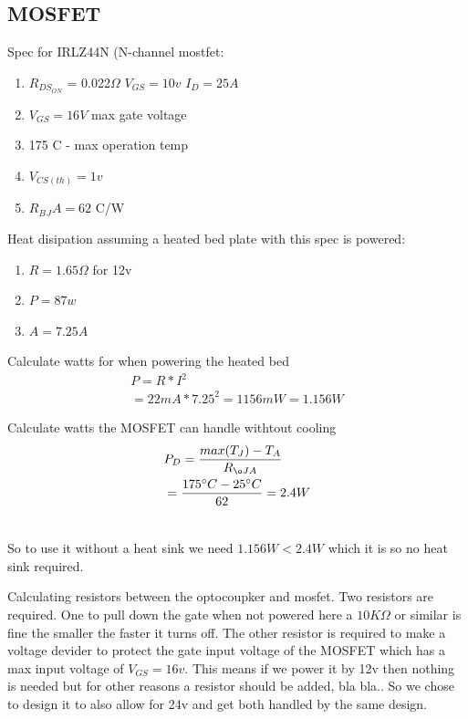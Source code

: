 \documentclass{article}
\begin{document}
\subsection{MOSFET}

Spec for IRLZ44N (N-channel mostfet:

\begin{enumerate}
	\item $R_{DS_{ON}}$ = 0.022$\Omega$ $V_{GS}=10v$ $I_D = 25A$
	\item $V_{GS}=16V$ max gate voltage
	\item 175 \degree{}C - max operation temp
	\item $V_{CS(th)} = 1v$
	\item $R_B{_JA}=62$ \degree{}C/W
\end{enumerate}

Heat disipation assuming a heated bed plate with this spec is powered:
\begin{enumerate}
	\item $R = 1.65\Omega$ for 12v
	\item $P = 87 w$
	\item $A=7.25A$
\end{enumerate}

Calculate watts for when powering the heated bed
\begin{equation}
 \begin{multlined}
P = R*I^2\\
 = 22mA*7.25^2 = 1156mW = 1.156W
\end{multlined}
\end{equation}

Calculate watts the MOSFET can handle withtout cooling
\begin{equation}
 \begin{multlined}
P_D = \frac{max(T_J)-T_A}{R_{øJA}}\\
= \frac{175\degree{}C-25\degree{}C}{62} = 2.4 W\\
\end{multlined}
\end{equation}

So to use it without a heat sink we need $1.156W < 2.4W$ which it is so no heat sink required.

Calculating resistors between the optocoupker and mosfet. Two resistors are required. One to pull down the gate when not powered here a $10K\Omega$ or similar is fine the smaller the faster it turns off. The other resistor is required to make a voltage devider to protect the gate input voltage of the MOSFET which has a max input voltage of $V_{GS} = 16v$. This means if we power it by 12v then nothing is needed but for other reasons a resistor should be added, bla bla.. So we chose to design it to also allow for 24v and get both handled by the same design.
\end{document}
